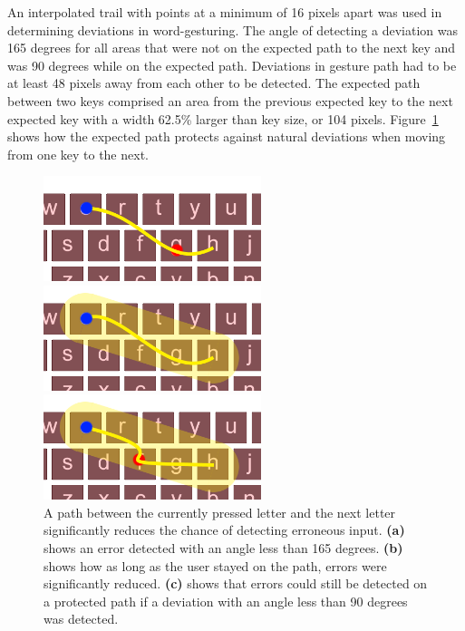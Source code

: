An interpolated trail with points at a minimum of 16 pixels apart was used in determining deviations in word-gesturing. The angle of detecting a deviation was 165 degrees for all areas that were not on the expected path to the next key and was 90 degrees while on the expected path. Deviations in gesture path had to be at least 48 pixels away from each other to be detected. The expected path between two keys comprised an area from the previous expected key to the next expected key with a width 62.5\% larger than key size, or 104 pixels. Figure~\ref{protected_path} shows how the expected path protects against natural deviations when moving from one key to the next.

\begin{figure}[h]
	\centering
	\begin{minipage}[t]{3in}
		\includegraphics[width=2.5in]{fig_path_no_protection}
	\end{minipage}
	\begin{minipage}[t]{2.5in}
		\includegraphics[width=2.5in]{fig_path_no_error}
	\end{minipage}
	\begin{minipage}[t]{2.5in}
		\includegraphics[width=2.5in]{fig_path_with_error}
	\end{minipage}
	\caption[Protected Path Example]{A path between the currently pressed letter and the next letter significantly reduces the chance of detecting erroneous input. \textbf{(a)} shows an error detected with an angle less than 165 degrees. \textbf{(b)} shows how as long as the user stayed on the path, errors were significantly reduced. \textbf{(c)} shows that errors could still be detected on a protected path if a deviation with an angle less than 90 degrees was detected.}
	\label{protected_path}
\end{figure}


